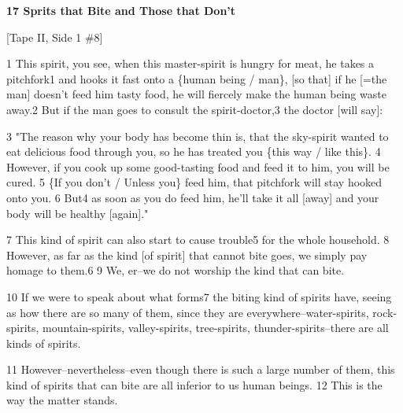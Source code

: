 
\textbf{17 Sprits that Bite and Those that Don't}

[Tape II, Side 1 \#8]

1 This spirit, you see, when this master-spirit is hungry for meat, he takes a
pitchfork1 and hooks it fast onto a \{human being / man\}, [so that] if he [=the
man] doesn't feed him tasty food, he will fiercely make the human being waste away.2
But if the man goes to consult the spirit-doctor,3 the doctor [will say]:

3 "The reason why your body has become thin is, that the sky-spirit wanted
to eat delicious food through you, so he has treated you \{this way / like this\}.
4 However, if you cook up some good-tasting food and feed it to him, you will be
cured. 5 \{If you don't / Unless you\} feed him, that pitchfork will stay hooked
onto you. 6 But4 as soon as you do feed him, he'll take it all [away] and your
body will be healthy [again]."

7 This kind of spirit can also start to cause trouble5 for the whole household.
8 However, as far as the kind [of spirit] that cannot bite goes, we simply pay
homage to them.6 9 We, er--we do not worship the kind that can bite.

10 If we were to speak about what forms7 the biting kind of spirits have, seeing
as how there are so many of them, since they are everywhere--water-spirits, rock-spirits,
mountain-spirits, valley-spirits, tree-spirits, thunder-spirits--there are all
kinds of spirits.

11 However--nevertheless--even though there is such a large number of them, this
kind of spirits that can bite are all inferior to us human beings. 12 This is the
way the matter stands.

